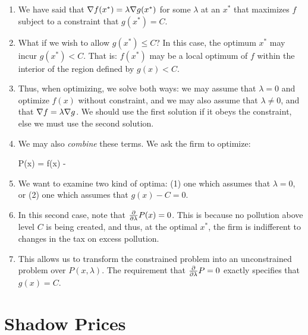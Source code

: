 \documentclass[11pt, oneside]{amsart}
\begin{document}
\begin{enumerate}
  \item We have said that $\nabla f(x^*) = \lambda \nabla g(x^*)$ for some
  $\lambda$ at an $x^*$ that maximizes $f$ subject to a constraint that
  $g(x^*) = C$.

  \item What if we wish to allow $g(x^*) \leq C$? In this case, the
  optimum $x^*$ may incur $g(x^*) < C$. That is: $f(x^*)$ may be a local
  optimum of $f$ within the interior of the region defined by $g(x) <
  C$.

  \item Thus, when optimizing, we solve both ways: we may assume that
  $\lambda = 0$ and optimize $f(x)$ without constraint, and we may also
  assume that $\lambda \ne 0$, and that $\nabla f = \lambda \nabla g$. We
  should use the first solution if it obeys the constraint, else we must
  use the second solution.

  \item We may also \emph{combine} these terms. We ask the firm to
  optimize:

  \begin{nedqn}
    P(x) = f(x) - \lambda {}
  \end{nedqn}

  \item We want to examine two kind of optima: (1) one which assumes
  that $\lambda = 0$, or (2) one which assumes that $g(x) - C = 0$.

  \item In this second case, note that $\frac{\partial }{\partial \lambda} P(x) = 0$.
  This is because no pollution above level $C$ is being created, and
  thus, at the optimal $x^*$, the firm is indifferent to changes in the
  tax on excess pollution.

  \item This allows us to transform the constrained problem into an
  unconstrained problem over $P(x, \lambda)$. The requirement that
  $\frac{\partial }{\partial \lambda} P = 0$ exactly specifies that $g(x) = C$.
\end{enumerate}

\section{Shadow Prices}
\end{document}
